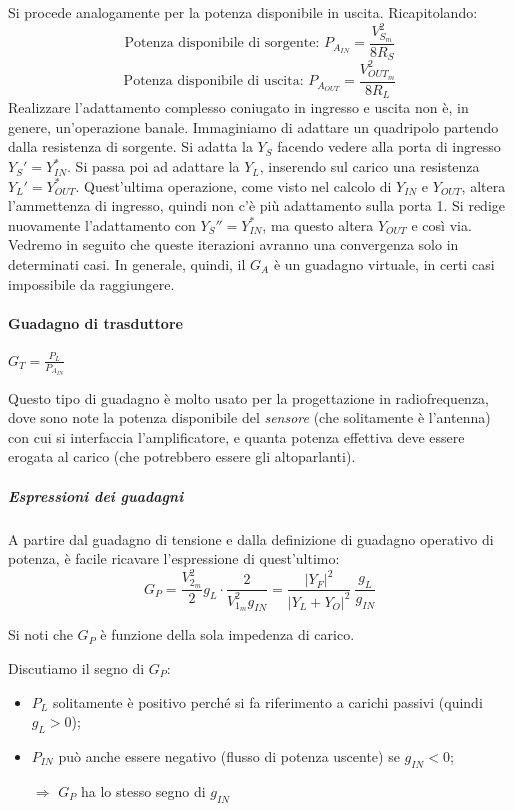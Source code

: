 Si procede analogamente per la potenza disponibile in uscita. Ricapitolando:
$$\mbox{Potenza disponibile di sorgente: }
P_{A_{IN}} = \frac{V_{S_m}^2}{8 R_S}$$
$$\mbox{Potenza disponibile di uscita: }
P_{A_{OUT}} = \frac{V_{OUT_m}^2}{8 R_L}$$
  Realizzare l'adattamento complesso coniugato in ingresso e uscita non è, in genere, un'operazione banale. Immaginiamo di adattare un quadripolo partendo dalla resistenza di sorgente. Si adatta la $Y_S$ facendo vedere alla porta di ingresso $Y_S'=Y_{IN}^*$. Si passa poi ad adattare la $Y_L$, inserendo sul carico una resistenza $Y_L' = Y_{OUT}^*$. Quest'ultima operazione, come visto nel calcolo di $Y_{IN}$ e $Y_{OUT}$, altera l'ammettenza di ingresso, quindi non c'è più adattamento sulla porta 1. Si redige nuovamente l'adattamento con $Y_S''=Y_{IN}^*$, ma questo altera $Y_{OUT}$ e così via. Vedremo in seguito che queste iterazioni avranno una convergenza solo in determinati casi. In generale, quindi, il $G_A$ è un guadagno virtuale, in certi casi impossibile da raggiungere.
      
\paragraph{Guadagno di trasduttore} $G_T = \frac{P_{L}}{P_{A_{IN}}}$

Questo tipo di guadagno è molto usato per la progettazione in radiofrequenza, dove sono note la potenza disponibile del \textit{sensore} (che solitamente è l'antenna) con cui si interfaccia l'amplificatore, e quanta potenza effettiva deve essere erogata al carico (che potrebbero essere gli altoparlanti).

\subparagraph{Espressioni dei guadagni}
A partire dal guadagno di tensione e dalla definizione di guadagno operativo di potenza, è facile ricavare l'espressione di quest'ultimo:
$$G_P = \frac{V_{2_m}^2}{2} g_L \cdot \frac{2}{V_{1_m}^2 g_{IN}} = \frac{|Y_F|^2}{|Y_L + Y_O|^2} ~ \frac{g_L}{g_{IN}}$$

Si noti che $G_P$ è funzione della sola impedenza di carico.

Discutiamo il segno di $G_P$:
\begin{itemize}
	\item $P_L$ solitamente è positivo perché si fa riferimento a carichi passivi (quindi $g_L > 0$);
	\item $P_{IN}$ può anche essere negativo (flusso di potenza uscente) se $g_{IN}<0$;
	\item [$\Rightarrow$] $G_P$ ha lo stesso segno di $g_{IN}$
\end{itemize}

